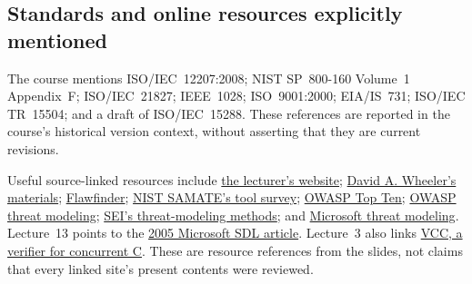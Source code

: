 \documentclass[11pt,a4paper]{article}
\numberwithin{figure}{section}
\begin{document}
\subsection{Standards and online resources explicitly mentioned}
The course mentions ISO/IEC~12207:2008; NIST SP~800-160 Volume~1 Appendix~F; ISO/IEC~21827; IEEE~1028; ISO~9001:2000; EIA/IS~731; ISO/IEC TR~15504; and a draft of ISO/IEC~15288. These references are reported in the course's historical version context, without asserting that they are current revisions.

Useful source-linked resources include \href{https://danielefriolo.github.io}{the lecturer's website}; \href{https://github.com/david-a-wheeler}{David A. Wheeler's materials}; \href{https://dwheeler.com/flawfinder/}{Flawfinder}; \href{https://www.nist.gov/itl/ssd/software-quality-group/samate/samate-tool-survey}{NIST SAMATE's tool survey}; \href{https://owasp.org/www-project-top-ten/}{OWASP Top Ten}; \href{https://owasp.org/www-community/Threat_Modeling_Process}{OWASP threat modeling}; \href{https://insights.sei.cmu.edu/blog/threat-modeling-12-available-methods/}{SEI's threat-modeling methods}; and \href{https://www.microsoft.com/en-us/securityengineering/sdl/threatmodeling}{Microsoft threat modeling}. Lecture~13 points to the \href{https://learn.microsoft.com/en-us/archive/msdn-magazine/2005/november/a-look-inside-the-security-development-lifecycle-at-microsoft}{2005 Microsoft SDL article}. Lecture~3 also links \href{https://www.microsoft.com/en-us/research/project/vcc-a-verifier-for-concurrent-c/}{VCC, a verifier for concurrent C}. These are resource references from the slides, not claims that every linked site's present contents were reviewed.
\end{document}
